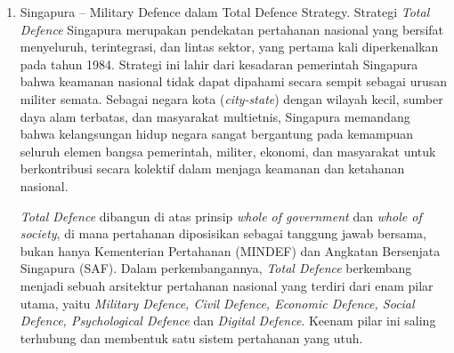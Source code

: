 \begin{enumerate}
  DoD AS membagi transformasi digital pertahanan dalam empat pilar:
  \begin{enumerate}
    \item \textit{Innovate for competitive advantage}. 
    Inovasi adalah kunci kesiapan masa depan.
    Inovasi sangat penting untuk mempertahankan dan memperluas keunggulan dalam menghadapi persaingan dan ancaman.
    \item \textit{Optimize for efficiencies and improved capability}.
    Untuk menghadirkan kapabilitas teknologi informasi (TI) dengan efisiensi dan kinerja yang lebih tinggi, Departemen pertahanan harus mereformasi cara operasionalnya.
    Implementasi teknologi harus dipercepat.
    \item \textit{Evolve cybersecurity for resilient defense posture}.
    Aktivitas siber berbahaya terus meningkat secara global. Departemen harus mengadopsi pola pikir “Utamakan siber, selalu siber”.
    Setiap jaringan, sistem, aplikasi dan layanan perusahaan harus aman sejak awal.
    \item \textit{Cultivate talent for a digital workforce}.
    Tujuannya untuk menghasilkan tenaga kerja yang memadai,
    terdiri dari para profesional yang terlatih dan berkualifikasi tinggi untuk mendukung dan mempertahankan informasi departemen pertahanan.
  \end{enumerate}
  \item Singapura – Military Defence dalam Total Defence Strategy.
  Strategi \textit{Total Defence} Singapura merupakan pendekatan pertahanan nasional yang bersifat menyeluruh, terintegrasi, dan lintas sektor, yang pertama kali diperkenalkan pada tahun 1984.
  Strategi ini lahir dari kesadaran pemerintah Singapura bahwa keamanan nasional tidak dapat dipahami secara sempit sebagai urusan militer semata\autocite{Matthews2024}.
  Sebagai negara kota (\textit{city-state}) dengan wilayah kecil, sumber daya alam terbatas, dan masyarakat multietnis, Singapura memandang bahwa kelangsungan hidup negara sangat bergantung pada kemampuan seluruh elemen bangsa pemerintah, militer, ekonomi, dan masyarakat untuk berkontribusi secara kolektif dalam menjaga keamanan dan ketahanan nasional.

  \textit{Total Defence} dibangun di atas prinsip \textit{whole of government} dan \textit{whole of society}, di mana pertahanan diposisikan sebagai tanggung jawab bersama, bukan hanya Kementerian Pertahanan (MINDEF) dan Angkatan Bersenjata Singapura (SAF).
  Dalam perkembangannya, \textit{Total Defence} berkembang menjadi sebuah arsitektur pertahanan nasional yang terdiri dari enam pilar utama, yaitu \textit{Military Defence, Civil Defence, Economic Defence, Social Defence, Psychological Defence} dan \textit{Digital Defence}.
  Keenam pilar ini saling terhubung dan membentuk satu sistem pertahanan yang utuh.


\end{enumerate}
